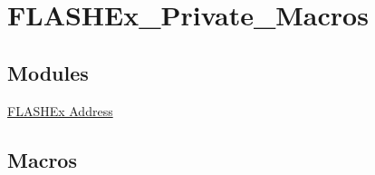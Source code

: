 \hypertarget{group___f_l_a_s_h_ex___private___macros}{\section{F\-L\-A\-S\-H\-Ex\-\_\-\-Private\-\_\-\-Macros}
\label{group___f_l_a_s_h_ex___private___macros}
}
\subsection*{Modules}
\begin{DoxyCompactItemize}
\item 
\hyperlink{group___f_l_a_s_h_ex___address}{F\-L\-A\-S\-H\-Ex Address}
\end{DoxyCompactItemize}
\subsection*{Macros}
